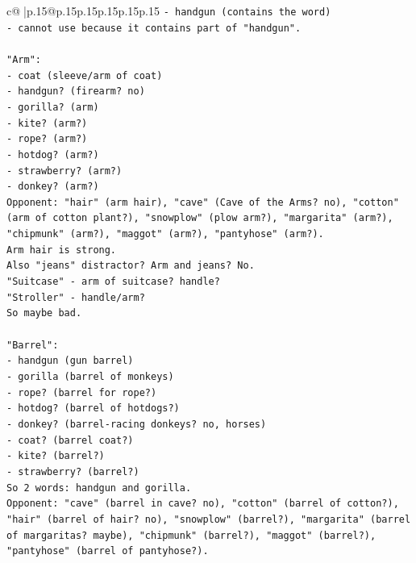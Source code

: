 \documentclass{article}
\begin{document}
{\begin{supertabular}{c@{$\;$}|p{.15\linewidth}@{}p{.15\linewidth}p{.15\linewidth}p{.15\linewidth}p{.15\linewidth}p{.15\linewidth}}
{{{\texttt{{-} handgun (contains the word)} \\
\texttt{{-} cannot use because it contains part of "handgun".} \\
\\ 
\texttt{"Arm":} \\
\texttt{{-} coat (sleeve/arm of coat)} \\
\texttt{{-} handgun? (firearm? no)} \\
\texttt{{-} gorilla? (arm)} \\
\texttt{{-} kite? (arm?)} \\
\texttt{{-} rope? (arm?)} \\
\texttt{{-} hotdog? (arm?)} \\
\texttt{{-} strawberry? (arm?)} \\
\texttt{{-} donkey? (arm?)} \\
\texttt{Opponent: "hair" (arm hair), "cave" (Cave of the Arms? no), "cotton" (arm of cotton plant?), "snowplow" (plow arm?), "margarita" (arm?), "chipmunk" (arm?), "maggot" (arm?), "pantyhose" (arm?).} \\
\texttt{Arm hair is strong.} \\
\texttt{Also "jeans" distractor? Arm and jeans? No.} \\
\texttt{"Suitcase" {-} arm of suitcase? handle?} \\
\texttt{"Stroller" {-} handle/arm?} \\
\texttt{So maybe bad.} \\
\\ 
\texttt{"Barrel":} \\
\texttt{{-} handgun (gun barrel)} \\
\texttt{{-} gorilla (barrel of monkeys)} \\
\texttt{{-} rope? (barrel for rope?)} \\
\texttt{{-} hotdog? (barrel of hotdogs?)} \\
\texttt{{-} donkey? (barrel{-}racing donkeys? no, horses)} \\
\texttt{{-} coat? (barrel coat?)} \\
\texttt{{-} kite? (barrel?)} \\
\texttt{{-} strawberry? (barrel?)} \\
\texttt{So 2 words: handgun and gorilla.} \\
\texttt{Opponent: "cave" (barrel in cave? no), "cotton" (barrel of cotton?), "hair" (barrel of hair? no), "snowplow" (barrel?), "margarita" (barrel of margaritas? maybe), "chipmunk" (barrel?), "maggot" (barrel?), "pantyhose" (barrel of pantyhose?).} \\
}}}
\end{supertabular}}
\end{document}
